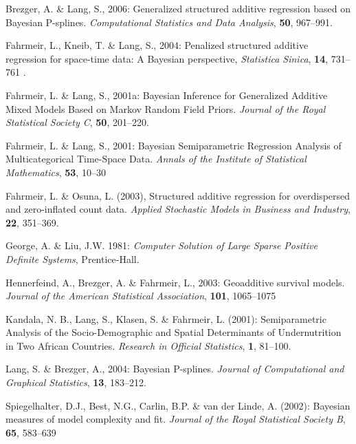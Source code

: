 \documentclass[a4paper]{article}
\begin{document}
\begin{thebibliography}{99}

 Brezger, A. \& Lang,
S., 2006: Generalized structured additive regression based on
Bayesian P-splines. {\it Computational Statistics and Data
Analysis}, {\bf 50}, 967--991.

 Fahrmeir, L., Kneib,
T. \& Lang, S., 2004: Penalized structured additive regression for
space-time data: A Bayesian perspective, {\it Statistica Sinica},
{\bf 14}, 731--761 .

 Fahrmeir, L. \&
Lang, S., 2001a: Bayesian Inference for Generalized Additive Mixed
Models Based on Markov Random Field Priors. {\it Journal of the
Royal Statistical Society C}, {\bf 50}, 201--220.

 Fahrmeir, L. \&
Lang, S., 2001: Bayesian Semiparametric Regression Analysis of
Multicategorical Time-Space Data. {\it Annals of the Institute of
Statistical Mathematics}, {\bf 53}, 10--30

 Fahrmeir, L. \& Osuna, L. (2003), Structured additive regression for
overdispersed and zero-inflated count data. {\it Applied Stochastic Models in Business and Industry}, {\bf 22}, 351--369.

 George, A. \& Liu,
J.W. 1981: {\it Computer Solution of Large Sparse Positive
Definite Systems}, Prentice-Hall.

 Hennerfeind, A.,
Brezger, A. \& Fahrmeir, L., 2003: Geoadditive survival models.
{\it Journal of the American Statistical Association}, {\bf 101}, 1065--1075

 Kandala, N. B., Lang,
S., Klasen, S. \& Fahrmeir, L. (2001): Semiparametric Analysis of
the Socio-Demographic and Spatial Determinants of Undernutrition
in Two African Countries. {\it Research in Official Statistics},
{\bf 1}, 81--100.

 Lang, S. \& Brezger,
A., 2004: Bayesian P-splines. {\it Journal of Computational and
Graphical Statistics}, {\bf 13}, 183--212.

 Spiegelhalter,
D.J., Best, N.G., Carlin, B.P. \& van der Linde, A. (2002):
Bayesian measures of model complexity and fit. {\it Journal of the
Royal Statistical Society B}, {\bf 65}, 583--639

\end{thebibliography}
\end{document}
